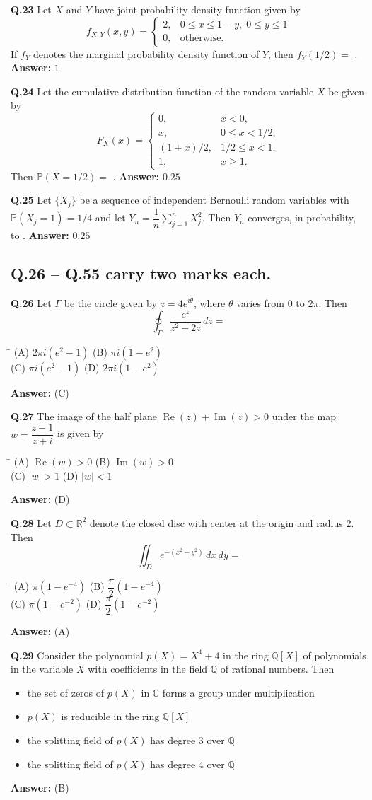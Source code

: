 \documentclass[11pt,a4paper]{article}
\newcommand{\optsfourA}[4]{%
  \begin{tabbing}
    \hspace{0.48\linewidth}\=\kill
    (A) #1 \> (B) #2 \\[2pt]
    (C) #3 \> (D) #4
  \end{tabbing}%
}
\newcommand{\optslistA}[4]{%
  \begin{itemize}
    \setlength{\itemsep}{2pt}\setlength{\parskip}{0pt}
    \item[(A)] #1
    \item[(B)] #2
    \item[(C)] #3
    \item[(D)] #4
  \end{itemize}%
}
\newcommand{\ans}[1]{\textbf{Answer:} #1\par\medskip}
\begin{document}
\textbf{Q.23} Let $X$ and $Y$ have joint probability density function given by
\[
  f_{X,Y}(x, y) = \begin{cases} 2, & 0 \le x \le 1 - y,\; 0 \le y \le 1 \\ 0, & \text{otherwise.} \end{cases}
\]
If $f_Y$ denotes the marginal probability density function of $Y$, then $f_Y(1/2) =$ \underline{\hspace{2cm}}.
\ans{$1$}

\textbf{Q.24} Let the cumulative distribution function of the random variable $X$ be given by
\[
  F_X(x) = \begin{cases}
    0, & x < 0, \\
    x, & 0 \le x < 1/2, \\
    (1 + x)/2, & 1/2 \le x < 1, \\
    1, & x \ge 1.
  \end{cases}
\]
Then $\mathbb{P}(X = 1/2) =$ \underline{\hspace{2cm}}.
\ans{$0.25$}

\textbf{Q.25} Let $\{X_j\}$ be a sequence of independent Bernoulli random variables with $\mathbb{P}(X_j = 1) = 1/4$ and let $Y_n = \dfrac{1}{n} \sum_{j=1}^{n} X_j^2$. Then $Y_n$ converges, in probability, to \underline{\hspace{2cm}}.
\ans{$0.25$}

\subsection*{Q.26 -- Q.55 carry two marks each.}

\textbf{Q.26} Let $\Gamma$ be the circle given by $z = 4e^{i\theta}$, where $\theta$ varies from $0$ to $2\pi$. Then
\[
  \oint_\Gamma \frac{e^z}{z^2 - 2z}\,dz =
\]
\optsfourA{$2\pi i(e^2 - 1)$}{$\pi i(1 - e^2)$}{$\pi i(e^2 - 1)$}{$2\pi i(1 - e^2)$}
\ans{(C)}

\textbf{Q.27} The image of the half plane $\operatorname{Re}(z) + \operatorname{Im}(z) > 0$ under the map $w = \dfrac{z - 1}{z + i}$ is given by
\optsfourA{$\operatorname{Re}(w) > 0$}{$\operatorname{Im}(w) > 0$}{$|w| > 1$}{$|w| < 1$}
\ans{(D)}

\textbf{Q.28} Let $D \subset \mathbb{R}^2$ denote the closed disc with center at the origin and radius $2$. Then
\[
  \iint_D e^{-(x^2 + y^2)}\,dx\,dy =
\]
\optsfourA{$\pi(1 - e^{-4})$}{$\dfrac{\pi}{2}(1 - e^{-4})$}{$\pi(1 - e^{-2})$}{$\dfrac{\pi}{2}(1 - e^{-2})$}
\ans{(A)}

\textbf{Q.29} Consider the polynomial $p(X) = X^4 + 4$ in the ring $\mathbb{Q}[X]$ of polynomials in the variable $X$ with coefficients in the field $\mathbb{Q}$ of rational numbers. Then
\optslistA{the set of zeros of $p(X)$ in $\mathbb{C}$ forms a group under multiplication}{$p(X)$ is reducible in the ring $\mathbb{Q}[X]$}{the splitting field of $p(X)$ has degree $3$ over $\mathbb{Q}$}{the splitting field of $p(X)$ has degree $4$ over $\mathbb{Q}$}
\ans{(B)}
\end{document}
